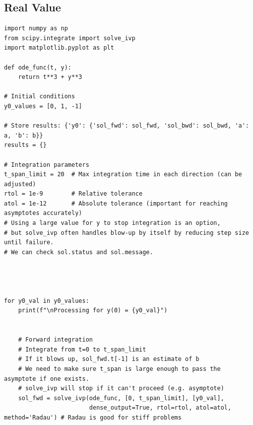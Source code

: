 \documentclass{article}
\begin{document}
\subsection{Real Value}

\begin{verbatim}
import numpy as np
from scipy.integrate import solve_ivp
import matplotlib.pyplot as plt

def ode_func(t, y):
    return t**3 + y**3

# Initial conditions
y0_values = [0, 1, -1]

# Store results: {'y0': {'sol_fwd': sol_fwd, 'sol_bwd': sol_bwd, 'a': a, 'b': b}}
results = {}

# Integration parameters
t_span_limit = 20  # Max integration time in each direction (can be adjusted)
rtol = 1e-9        # Relative tolerance
atol = 1e-12       # Absolute tolerance (important for reaching asymptotes accurately)
# Using a large value for y to stop integration is an option,
# but solve_ivp often handles blow-up by itself by reducing step size until failure.
# We can check sol.status and sol.message.




for y0_val in y0_values:
    print(f"\nProcessing for y(0) = {y0_val}")


    # Forward integration
    # Integrate from t=0 to t_span_limit
    # If it blows up, sol_fwd.t[-1] is an estimate of b
    # We need to make sure t_span is large enough to pass the asymptote if one exists.
    # solve_ivp will stop if it can't proceed (e.g. asymptote)
    sol_fwd = solve_ivp(ode_func, [0, t_span_limit], [y0_val],
                        dense_output=True, rtol=rtol, atol=atol, method='Radau') # Radau is good for stiff problems


\end{verbatim}
\end{document}
